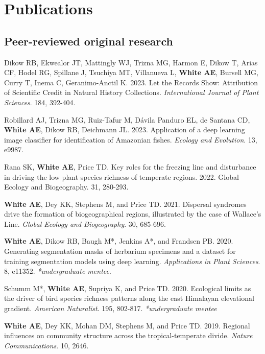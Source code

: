 \documentclass[letterpaper]{article}
\newenvironment{biblist}{%
   \begin{list}{}{%
     \setlength{\labelwidth}{0pt}%
     \setlength{\labelsep}{1em}%
     \setlength{\leftmargin}{2em}%
     \setlength{\itemindent}{-1em}%
   }
}{\end{list}}
\begin{document}
\section*{Publications}
\subsection*{Peer-reviewed original research}
\begin{biblist}

\item Dikow RB, Ekwealor JT, Mattingly WJ, Trizna MG, Harmon E, Dikow T, Arias CF, Hodel RG, Spillane J, Tsuchiya MT, Villanueva L, \textbf{White AE}, Bursell MG, Curry T, Inema C, Geranimo-Anctil K. 2023. Let the Records Show: Attribution of Scientific Credit in Natural History Collections. \textit{International Journal of Plant Sciences}. 184, 392-404.

\item Robillard AJ, Trizna MG, Ruiz‐Tafur M, Dávila Panduro EL, de Santana CD, \textbf{White AE}, Dikow RB, Deichmann JL. 2023. Application of a deep learning image classifier for identification of Amazonian fishes. \textit{Ecology and Evolution}. 13, e9987.

\item Rana SK, \textbf{White AE}, Price TD. Key roles for the freezing line and disturbance in driving the low plant species richness of temperate regions. 2022. Global Ecology and Biogeography. 31, 280-293.

\item \textbf{White AE}, Dey KK, Stephens M, and Price TD. 2021. Dispersal syndromes drive the formation of biogeographical regions, illustrated by the case of Wallace's Line. \textit{Global Ecology and Biogeography}. 30, 685-696.

\item \textbf{White AE}, Dikow RB, Baugh M*, Jenkins A*, and Frandsen PB. 2020. Generating segmentation masks of herbarium specimens and a dataset for training segmentation models using deep learning. \textit{Applications in Plant Sciences}. 8, e11352. \textit{*undergraduate mentee}.

\item  Schumm M*, \textbf{White AE}, Supriya K, and Price TD. 2020. Ecological limits as the driver of bird species richness patterns along the east Himalayan elevational gradient. \textit{American Naturalist}. 195, 802-817. \textit{*undergraduate mentee}

\item \textbf{White AE}, Dey KK, Mohan DM, Stephens M, and Price TD. 2019. Regional influences on community structure across the tropical-temperate divide. \textit{Nature Communications}. 10, 2646.


\end{biblist}
\end{document}
